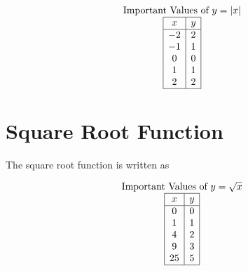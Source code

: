 \documentclass[nooutcomes]{ximera}
\begin{document}
\begin{center}
\end{center}

\[
\begin{array}{c }
\text{Important Values of $y=|x|$} \\
\begin{array}{|c|c|}
 \hline
 x & y\\
 \hline
 -2&2\\ 
-1&1\\ 
0&0\\
 1&1\\
 2&2\\
 \hline
\end{array}
\end{array}
\]



\newpage


\section{Square Root Function}
The square root function is written as

\begin{center}
\end{center}

\begin{center}
\end{center}


\[
\begin{array}{c }
 \text{Important Values of $y=\sqrt{x}$} \\
\begin{array}{|c|c|}
 \hline
 x & y\\
 \hline
 0&0\\
 1&1\\
 4&2\\
 9&3\\
 25&5\\
 \hline
\end{array}
\end{array}
\]
\end{document}
